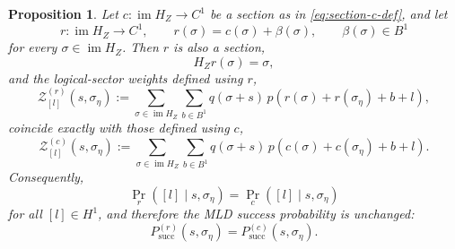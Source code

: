 \documentclass[twoside,english,aps,showpacs,pra,superscriptaddress]{revtex4-2}
\DeclareMathOperator{\im}{im}
\newtheorem{proposition}{Proposition}
\begin{document}
\begin{proposition}\label{prop:boundary-shift-invariance}
Let \(c:\im H_Z\to C^1\) be a section as in \eqref{eq:section-c-def}, and let
\begin{equation}\label{eq:r-boundary-shift}
    r:\im H_Z\to C^1,
    \qquad
    r(\sigma)=c(\sigma)+\beta(\sigma),
    \qquad
    \beta(\sigma)\in B^1
\end{equation}
for every \(\sigma\in \im H_Z\). Then \(r\) is also a section,
\begin{equation}\label{eq:r-is-section}
    H_Z r(\sigma)=\sigma,
\end{equation}
and the logical-sector weights defined using \(r\),
\begin{equation}\label{eq:Zl-r-def}
    \mathcal Z^{(r)}_{[l]}(s,\sigma_\eta)
    :=\sum_{\sigma\in \im H_Z}\sum_{b\in B^1}
    q(\sigma+s)\,
    p\!\left(r(\sigma)+r(\sigma_\eta)+b+l\right),
\end{equation}
coincide exactly with those defined using \(c\),
\begin{equation}\label{eq:Zl-c-def}
    \mathcal Z^{(c)}_{[l]}(s,\sigma_\eta)
    :=\sum_{\sigma\in \im H_Z}\sum_{b\in B^1}
    q(\sigma+s)\,
    p\!\left(c(\sigma)+c(\sigma_\eta)+b+l\right).
\end{equation}
Consequently,
\begin{equation}\label{eq:posterior-invariance}
    \Pr_r([l]\mid s,\sigma_\eta)=\Pr_c([l]\mid s,\sigma_\eta)
\end{equation}
for all \([l]\in H^1\), and therefore the MLD success probability is unchanged:
\begin{equation}\label{eq:success-invariance}
    P_{\mathrm{succ}}^{(r)}(s,\sigma_\eta)
    =
    P_{\mathrm{succ}}^{(c)}(s,\sigma_\eta).
\end{equation}
\end{proposition}
\end{document}
